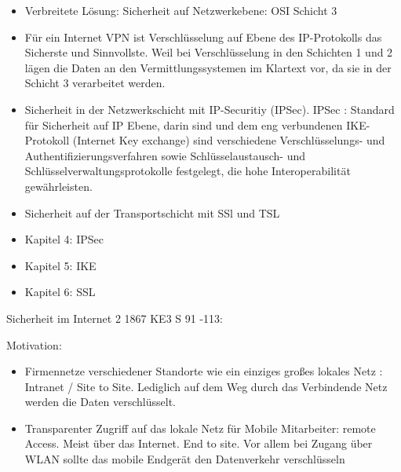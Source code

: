 \begin{itemize}
\begin{itemize}
  					\item Verbreitete Lösung: Sicherheit auf Netzwerkebene: OSI Schicht 3
  					\item Für ein Internet VPN ist Verschlüsselung auf Ebene des IP-Protokolls das Sicherste und Sinnvollste. Weil bei Verschlüsselung in den Schichten 1 und 2 lägen die Daten an den Vermittlungssystemen im Klartext vor, da sie in der Schicht 3 verarbeitet werden. 
  					\item Sicherheit in der Netzwerkschicht mit IP-Securitiy (IPSec). IPSec : Standard für Sicherheit auf IP Ebene, darin sind und dem eng verbundenen IKE-Protokoll (Internet Key exchange) sind verschiedene Verschlüsselungs- und Authentifizierungsverfahren sowie Schlüsselaustausch- und Schlüsselverwaltungsprotokolle festgelegt, die hohe Interoperabilität gewährleisten. 
  					\item Sicherheit auf der Transportschicht mit SSl und TSL
  					\item Kapitel 4: IPSec
  					\item Kapitel 5: IKE
  					\item Kapitel 6: SSL
  					\end{itemize}					
 
\end{itemize}


Sicherheit im Internet 2 1867 KE3 S 91 -113: 

Motivation:
\begin{itemize}
	\item Firmennetze verschiedener Standorte wie ein einziges großes lokales Netz : Intranet / Site to Site. Lediglich auf dem Weg durch das Verbindende Netz werden die Daten verschlüsselt.
	\item Transparenter Zugriff auf das lokale Netz für Mobile Mitarbeiter: remote Access. Meist über das Internet. End to site. Vor allem bei Zugang über WLAN sollte das mobile Endgerät den Datenverkehr verschlüsseln  
\end{itemize}
